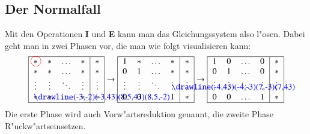 \subsection{Der Normalfall}
Mit den Operationen {\bf I} und {\bf E} kann man das Gleichungssystem
also l"osen. Dabei geht man in zwei Phasen vor, die man wie folgt
visualisieren kann:
\begin{gather*}
\begin{tabular}{|>{$}c<{$}>{$}c<{$}>{$}c<{$}>{$}c<{$}|>{$}c<{$}|}
\hline
\begin{picture}(0,0)
\color{red}\put(2.7,3.1){\circle{12}}
\end{picture}%
*&*&\dots&*&*\\
*&*&\dots&*&*\\
\vdots& \vdots& \ddots& \vdots&\vdots\\
\begin{picture}(0,0)
\color{blue}\drawline(-3,-2)(-3,43)(8.5,43)(8.5,-2)
\end{picture}%
*&*&\dots&*&*\\
\hline
\end{tabular}
\rightarrow
\begin{tabular}{|>{$}c<{$}>{$}c<{$}>{$}c<{$}>{$}c<{$}|>{$}c<{$}|}
\hline
1&*&\dots&*&*\\
0&1&\dots&*&*\\
\vdots& \vdots& \ddots&\begin{picture}(0,0)
\color{blue}\drawline(-4,43)(-4,-3)(7,-3)(7,43)
\end{picture}%
\vdots&\vdots\\
0&0&\dots&1&*\\
\hline
\end{tabular}
\rightarrow
\begin{tabular}{|>{$}c<{$}>{$}c<{$}>{$}c<{$}>{$}c<{$}|>{$}c<{$}|}
\hline
1&0&\dots&0&*\\
0&1&\dots&0&*\\
\vdots& \vdots& \ddots& \vdots&\vdots\\
0&0&\dots&1&*\\
\hline
\end{tabular}
\end{gather*}
Die erste Phase wird auch Vorw"artsreduktion genannt, die
zweite Phase R"uckw"artseinsetzen.
